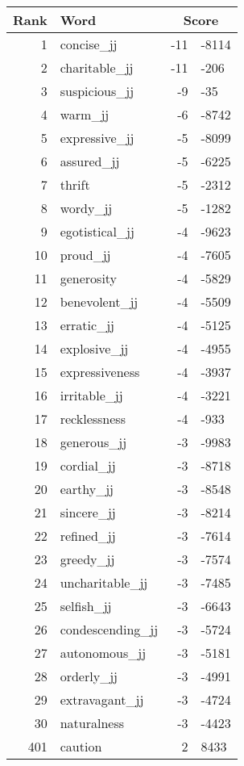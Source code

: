 \begin{longtable}[!htbp]{| rlr@{.}l |}
    \hline
    \textbf{Rank} & \textbf{Word} & \multicolumn{2}{c|}{\textbf{Score}} \\
    \hline
    \endhead
    1 & concise\_jj & -11 & -8114 \\
    2 & charitable\_jj & -11 & -206 \\
    3 & suspicious\_jj & -9 & -35 \\
    4 & warm\_jj & -6 & -8742 \\
    5 & expressive\_jj & -5 & -8099 \\
    6 & assured\_jj & -5 & -6225 \\
    7 & thrift & -5 & -2312 \\
    8 & wordy\_jj & -5 & -1282 \\
    9 & egotistical\_jj & -4 & -9623 \\
    10 & proud\_jj & -4 & -7605 \\
    11 & generosity & -4 & -5829 \\
    12 & benevolent\_jj & -4 & -5509 \\
    13 & erratic\_jj & -4 & -5125 \\
    14 & explosive\_jj & -4 & -4955 \\
    15 & expressiveness & -4 & -3937 \\
    16 & irritable\_jj & -4 & -3221 \\
    17 & recklessness & -4 & -933 \\
    18 & generous\_jj & -3 & -9983 \\
    19 & cordial\_jj & -3 & -8718 \\
    20 & earthy\_jj & -3 & -8548 \\
    21 & sincere\_jj & -3 & -8214 \\
    22 & refined\_jj & -3 & -7614 \\
    23 & greedy\_jj & -3 & -7574 \\
    24 & uncharitable\_jj & -3 & -7485 \\
    25 & selfish\_jj & -3 & -6643 \\
    26 & condescending\_jj & -3 & -5724 \\
    27 & autonomous\_jj & -3 & -5181 \\
    28 & orderly\_jj & -3 & -4991 \\
    29 & extravagant\_jj & -3 & -4724 \\
    30 & naturalness & -3 & -4423 \\
    401 & caution & 2 & 8433 \\

\end{longtable}
